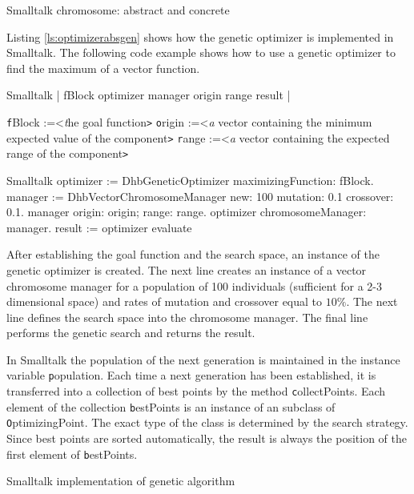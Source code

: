 \begin{listing} Smalltalk chromosome: abstract and concrete \label{ls:chromosome}


\end{listing}
Listing \ref{ls:optimizerabsgen} shows how the genetic optimizer
is implemented in Smalltalk. The following code example shows how
to use a genetic optimizer to find the maximum of a vector
function.

\begin{displaycode}{Smalltalk}
    | fBlock optimizer manager origin range result |
\end{displaycode}
 {\texttt fBlock :=<\textsl the goal function\texttt >}\hfil\break
 {\texttt origin :=<\textsl a vector containing the minimum expected value of the component\texttt >}\hfil\break
 {\texttt range :=<\textsl a vector containing the expected range of the component\texttt >}\hfil\break
\begin{displaycode}{Smalltalk}
    optimizer := DhbGeneticOptimizer maximizingFunction: fBlock.
    manager := DhbVectorChromosomeManager new: 100 mutation: 0.1 crossover: 0.1.
    manager origin: origin; range: range.
    optimizer chromosomeManager: manager.
    result := optimizer evaluate
\end{displaycode}
After establishing the goal function and the search space, an
instance of the genetic optimizer is created. The next line
creates an instance of a vector chromosome manager for a
population of 100 individuals (sufficient for a 2-3 dimensional
space) and rates of mutation and crossover equal to $10\%$. The
next line defines the search space into the chromosome manager.
The final line performs the genetic search and returns the result.

In Smalltalk the population of the next generation is maintained
in the instance variable {\texttt population}. Each time a next
generation has been established, it is transferred into a
collection of best points by the method {\texttt collectPoints}. Each
element of the collection {\texttt bestPoints} is an instance of an
subclass of {\texttt OptimizingPoint}. The exact type of the class is
determined by the search strategy. Since best points are sorted
automatically, the result is always the position of the first
element of  {\texttt bestPoints}.

\begin{listing} Smalltalk implementation of genetic algorithm \label{ls:optimizerabsgen}

\end{listing}


